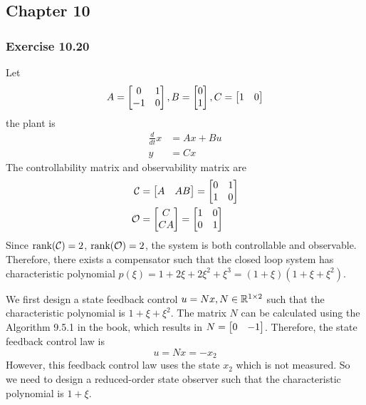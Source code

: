 \subsection{Chapter 10}
\subsubsection{Exercise 10.20}
Let 
\begin{align}
    A = \begin{bmatrix} 0 &1 \\ -1 &0 \end{bmatrix},
    B = \begin{bmatrix} 0 \\ 1 \end{bmatrix},
    C = \begin{bmatrix} 1 &0 \end{bmatrix}
\end{align}
the plant is 
\begin{align}
    \frac{d}{dt}x &= Ax + Bu \\
    y &= Cx
\end{align}
The controllability matrix and observability matrix are 
\begin{align}
    \mathcal{C} &= \begin{bmatrix} A &AB \end{bmatrix} = \begin{bmatrix} 0 &1 \\ 1 &0 \end{bmatrix} \\
    \mathcal{O} &= \begin{bmatrix} C \\ CA \end{bmatrix} = \begin{bmatrix} 1 &0 \\ 0 &1 \end{bmatrix}
\end{align}
Since $\textnormal{rank}(\mathcal{C})=2$, $\textnormal{rank}(\mathcal{O})=2$, the system is both controllable and observable. Therefore, there exists a compensator such that the closed loop system has characteristic polynomial $p(\xi)=1+2\xi+2\xi^2+\xi^3 = (1+\xi)(1+\xi+\xi^2)$.

We first design a state feedback control $u=Nx, N\in\mathbb{R}^{1\times 2}$ such that the characteristic polynomial is $1+\xi+\xi^2$. The matrix $N$ can be calculated using the Algorithm 9.5.1 in the book, which results in $N = \begin{bmatrix} 0 &-1 \end{bmatrix}$. Therefore, the state feedback control law is 
\begin{equation}
    u = Nx = -x_2
\end{equation}
However, this feedback control law uses the state $x_2$ which is not measured. So we need to design a reduced-order state observer such that the characteristic polynomial is $1+\xi$. 

